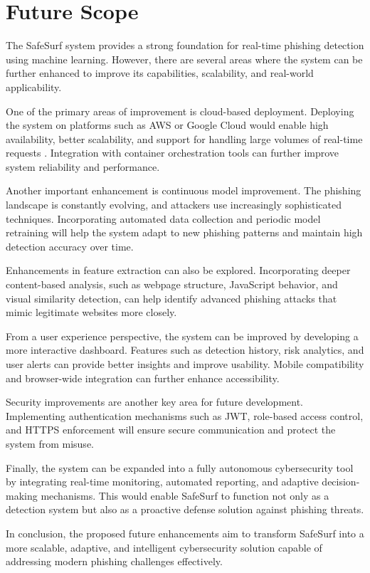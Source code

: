 \chapter{Future Scope}

The SafeSurf system provides a strong foundation for real-time phishing detection using machine learning. However, there are several areas where the system can be further enhanced to improve its capabilities, scalability, and real-world applicability.

One of the primary areas of improvement is cloud-based deployment. Deploying the system on platforms such as AWS or Google Cloud would enable high availability, better scalability, and support for handling large volumes of real-time requests \cite{ref21}. Integration with container orchestration tools can further improve system reliability and performance.

Another important enhancement is continuous model improvement. The phishing landscape is constantly evolving, and attackers use increasingly sophisticated techniques. Incorporating automated data collection and periodic model retraining will help the system adapt to new phishing patterns and maintain high detection accuracy over time.

Enhancements in feature extraction can also be explored. Incorporating deeper content-based analysis, such as webpage structure, JavaScript behavior, and visual similarity detection, can help identify advanced phishing attacks that mimic legitimate websites more closely.

From a user experience perspective, the system can be improved by developing a more interactive dashboard. Features such as detection history, risk analytics, and user alerts can provide better insights and improve usability. Mobile compatibility and browser-wide integration can further enhance accessibility.

Security improvements are another key area for future development. Implementing authentication mechanisms such as JWT, role-based access control, and HTTPS enforcement will ensure secure communication and protect the system from misuse.

Finally, the system can be expanded into a fully autonomous cybersecurity tool by integrating real-time monitoring, automated reporting, and adaptive decision-making mechanisms. This would enable SafeSurf to function not only as a detection system but also as a proactive defense solution against phishing threats.

In conclusion, the proposed future enhancements aim to transform SafeSurf into a more scalable, adaptive, and intelligent cybersecurity solution capable of addressing modern phishing challenges effectively.